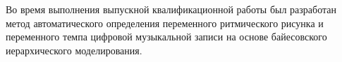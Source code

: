 
Во время выполнения выпускной квалификационной работы был разработан метод автоматического определения переменного ритмического рисунка и переменного темпа цифровой музыкальной записи на основе байесовского иерархического моделирования.